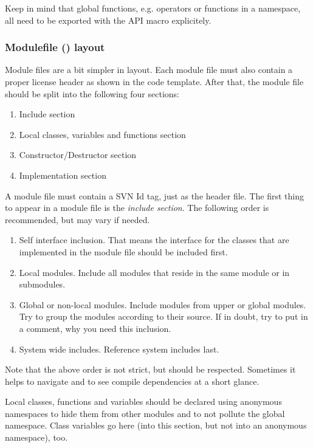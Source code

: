 Keep in mind that global functions, e.g. operators or functions in a namespace, all need to be exported with the API macro explicitely.



\subsubsection{Modulefile () layout}
Module files are a bit simpler in layout.
Each module file must also contain a proper license header as shown in the code template.
After that, the module file should be split into the following four sections:
\begin{enumerate}
\item Include section
\item Local classes, variables and functions section
\item Constructor/Destructor section
\item Implementation section
\end{enumerate}

A module file must contain a SVN Id tag, just as the header file.
The first thing to appear in a module file is the \emph{include section}.
The following order is recommended, but may vary if needed.
\begin{enumerate}
\item Self interface inclusion. 
That means the interface for the classes that are implemented in the module file should be included first.
\item Local modules. 
Include all modules that reside in the same module or in submodules.
\item Global or non-local modules.
Include modules from upper or global modules. 
Try to group the modules according to their source.
If in doubt, try to put in a comment, why you need this inclusion.
\item System wide includes.
Reference system includes last.
\end{enumerate}
Note that the above order is not strict, but should be respected.
Sometimes it helps to navigate and to see compile dependencies at a short glance.

Local classes, functions and variables should be declared using anonymous namespaces to hide them from other modules and to not pollute the global namespace.
Class variables go here (into this section, but not into an anonymous namespace), too.

